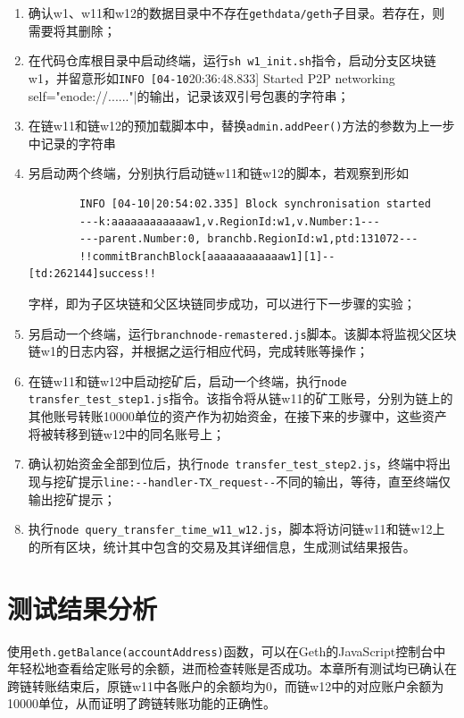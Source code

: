 \begin{enumerate}
    \item 确认w1、w11和w12的数据目录中不存在\verb|gethdata/geth|子目录。若存在，则需要将其删除；
    \item 在代码仓库根目录中启动终端，运行\verb|sh w1_init.sh|指令，启动分支区块链w1，并留意形如\verb|INFO [04-10|20:36:48.833] Started P2P networking self="enode://......"|的输出，记录该双引号包裹的字符串；
    \item 在链w11和链w12的预加载脚本中，替换\verb|admin.addPeer()|方法的参数为上一步中记录的字符串
    \item 另启动两个终端，分别执行启动链w11和链w12的脚本，若观察到形如\begin{verbatim}
        INFO [04-10|20:54:02.335] Block synchronisation started
        ---k:aaaaaaaaaaaaw1,v.RegionId:w1,v.Number:1---
        ---parent.Number:0, branchb.RegionId:w1,ptd:131072---
        !!commitBranchBlock[aaaaaaaaaaaaw1][1]--[td:262144]success!!
    \end{verbatim}
          字样，即为子区块链和父区块链同步成功，可以进行下一步骤的实验；
    \item 另启动一个终端，运行\verb|branchnode-remastered.js|脚本。该脚本将监视父区块链w1的日志内容，并根据之运行相应代码，完成转账等操作；
    \item 在链w11和链w12中启动挖矿后，启动一个终端，执行\verb|node transfer_test_step1.js|指令。该指令将从链w11的矿工账号，分别为链上的其他账号转账10000单位的资产作为初始资金，在接下来的步骤中，这些资产将被转移到链w12中的同名账号上；
    \item 确认初始资金全部到位后，执行\verb|node transfer_test_step2.js|，终端中将出现与挖矿提示\verb|line:--handler-TX_request--|不同的输出，等待，直至终端仅输出挖矿提示；
    \item 执行\verb|node query_transfer_time_w11_w12.js|，脚本将访问链w11和链w12上的所有区块，统计其中包含的交易及其详细信息，生成测试结果报告。
\end{enumerate}

\section{测试结果分析}

使用\verb|eth.getBalance(accountAddress)|函数，可以在Geth的JavaScript控制台中年轻松地查看给定账号的余额，进而检查转账是否成功。本章所有测试均已确认在跨链转账结束后，原链w11中各账户的余额均为0，而链w12中的对应账户余额为10000单位，从而证明了跨链转账功能的正确性。

